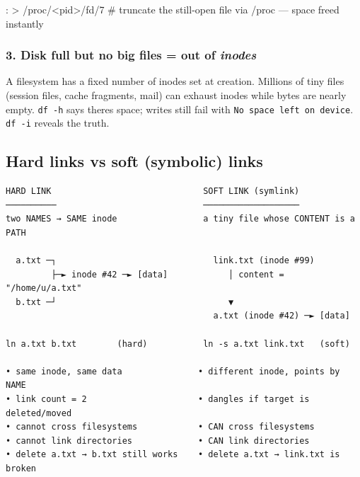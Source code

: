 \documentclass[11pt]{article}
\newenvironment{Shaded}{\begin{snugshade}}{\end{snugshade}}
\newcommand{\BuiltInTok}[1]{\textcolor[rgb]{0.50,0.55,0.55}{#1}}
\newcommand{\CommentTok}[1]{\textcolor[rgb]{0.48,0.49,0.49}{#1}}
\newcommand{\NormalTok}[1]{\textcolor[rgb]{0.81,0.81,0.76}{#1}}
\newcommand{\OperatorTok}[1]{\textcolor[rgb]{0.81,0.81,0.76}{#1}}
\begin{document}

\begin{Shaded}
\begin{Highlighting}[]
\BuiltInTok{:} \OperatorTok{\textgreater{}}\NormalTok{ /proc/}\OperatorTok{\textless{}}\NormalTok{pid}\OperatorTok{\textgreater{}}\NormalTok{/fd/7         }\CommentTok{\# truncate the still{-}open file via /proc — space freed instantly}
\end{Highlighting}
\end{Shaded}

\subsubsection{\texorpdfstring{3. Disk full but no big files = out of \emph{inodes}}{3. Disk full but no big files = out of inodes}}\label{3-disk-full-but-no-big-files--out-of-inodes}

A filesystem has a fixed number of inodes set at creation. Millions of tiny files (session files, cache fragments, mail) can exhaust inodes while bytes are nearly empty. \texttt{df\ -h} says there\textquotesingle s space; writes still fail with \texttt{No\ space\ left\ on\ device}. \texttt{df\ -i} reveals the truth.

\subsection{Hard links vs soft (symbolic) links}\label{hard-links-vs-soft-symbolic-links}

\setcodelang{}

\begin{verbatim}
HARD LINK                              SOFT LINK (symlink)
──────────                             ───────────────────
two NAMES → SAME inode                 a tiny file whose CONTENT is a PATH

  a.txt ─┐                               link.txt (inode #99)
         ├─► inode #42 ─► [data]            │ content = "/home/u/a.txt"
  b.txt ─┘                                  ▼
                                         a.txt (inode #42) ─► [data]

ln a.txt b.txt        (hard)           ln -s a.txt link.txt   (soft)

• same inode, same data               • different inode, points by NAME
• link count = 2                      • dangles if target is deleted/moved
• cannot cross filesystems            • CAN cross filesystems
• cannot link directories             • CAN link directories
• delete a.txt → b.txt still works    • delete a.txt → link.txt is broken
\end{verbatim}
\end{document}
